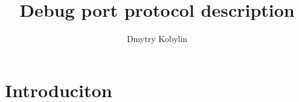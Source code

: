 \documentclass[a4paper,russian]{article}
\title{Debug port protocol description}
\author{Dmytry Kobylin}
\begin{document}
\maketitle

\tableofcontents
\newpage

\section{Introduciton}
\end{document}
